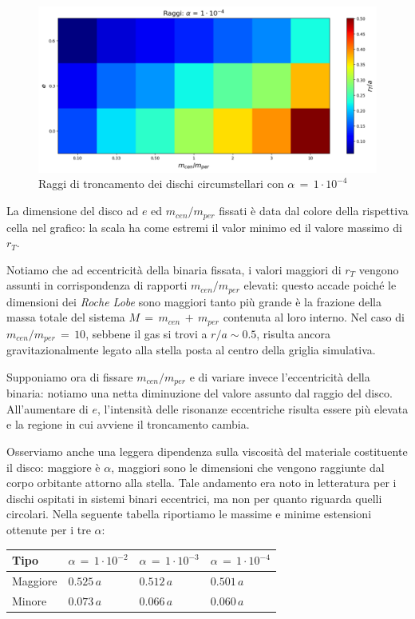 \begin{figure}[h]
  \centering
  \includegraphics[width=\textwidth]{Immagini/Risultati/raggi_alfa4.png}
  \caption{Raggi di troncamento dei dischi circumstellari con $\alpha\,=\,1 \cdot 10^{-4}$}
  \label{fig:raggi_alfa4}
\end{figure}
La dimensione del disco ad $e$ ed $m_{cen}/m_{per}$ fissati è data dal colore della rispettiva cella nel grafico: la scala ha come estremi il valor minimo ed il valore massimo di $r_T$. 

Notiamo che ad eccentricità della binaria fissata, i valori maggiori di $r_T$ vengono assunti in corrispondenza di rapporti $m_{cen}/m_{per}$ elevati: questo accade poiché le dimensioni dei \textit{Roche Lobe} sono maggiori tanto più grande è la frazione della massa totale del sistema $M\,=\,m_{cen}\,+\,m_{per}$ contenuta al loro interno.
Nel caso di $m_{cen}/m_{per}\,=\,10$, sebbene il gas si trovi a $r/a \sim 0.5$, risulta ancora gravitazionalmente legato alla stella posta al centro della griglia simulativa.

Supponiamo ora di fissare $m_{cen}/m_{per}$ e di variare invece l'eccentricità della binaria: notiamo una netta diminuzione del valore assunto dal raggio del disco. All'aumentare di $e$, l'intensità delle risonanze eccentriche risulta essere più elevata \parencite{ArtymowiczLubow1994} e la regione in cui avviene il troncamento cambia.

Osserviamo anche una leggera dipendenza sulla viscosità del materiale costituente il disco: maggiore è $\alpha$, maggiori sono le dimensioni che vengono raggiunte dal corpo orbitante attorno alla stella. Tale andamento era noto in letteratura per i dischi ospitati in sistemi binari eccentrici, ma non per quanto riguarda quelli circolari. Nella seguente tabella riportiamo le massime e minime estensioni ottenute per i tre $\alpha$:

\begin{table}[H]
\centering
\begin{tabular}{|C{2cm}|C{3cm}|C{3cm}|C{3cm}|}
\hline
{}
Tipo & $\alpha\,=\,1 \cdot 10^{-2}$ & $\alpha\,=\,1 \cdot 10^{-3}$ & $\alpha\,=\,1 \cdot 10^{-4}$\\
\hline
Maggiore & $0.525\,a$ & $0.512\,a$ & $0.501\,a$\\
\hline
Minore & $0.073\,a$ & $0.066\,a$ & $0.060\,a$\\
\hline
\end{tabular}
\end{table}

